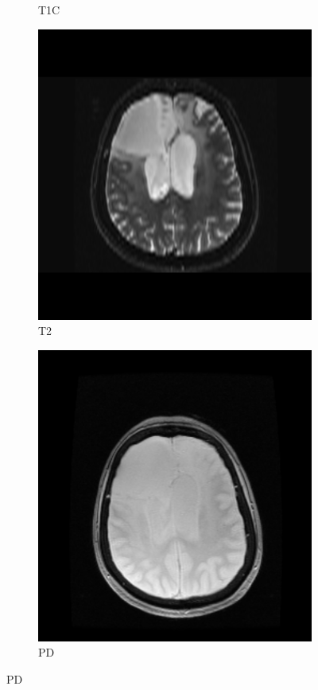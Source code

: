 \begin{figure}
\begin{subfigure}[t]{\figexamplewidth}
    \caption{\gls{T1C}}\label{fig:T1GD}
\end{subfigure}
\begin{subfigure}[t]{\figexamplewidth}
    \centering
    \includegraphics[width=\textwidth]{Figures/T2}
    \caption{\gls{T2}}\label{fig:T2w}
\end{subfigure}
\begin{subfigure}[t]{\figexamplewidth}
    \centering
    \includegraphics[width=\textwidth]{Figures/PD}
    \caption{\gls{PD}}\label{fig:PDw}
\end{subfigure}



\end{figure}
